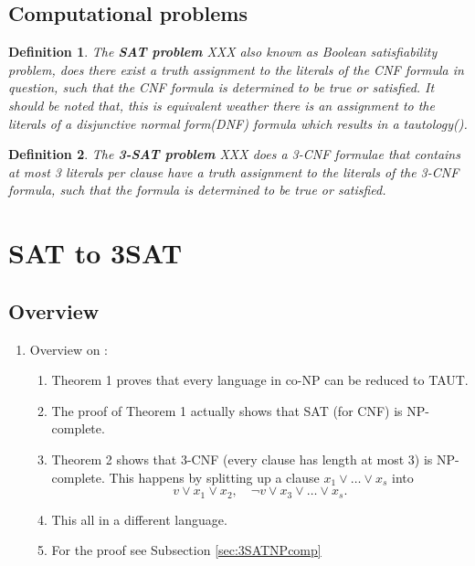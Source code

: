 \documentclass[a4paper]{report}
\newtheorem{defi}{Definition}[section]
\begin{document}
\section{Computational problems}
\label{sec:computationalproblems}

\begin{defi}\label{def:SATproblem}
  The \textbf{SAT problem} XXX also known as Boolean satisfiability problem, does there exist a truth assignment to the literals of the CNF formula in question, such that the CNF formula is determined to be true or satisfied. It should be noted that, this is equivalent weather there is an assignment to the literals of a disjunctive normal form(DNF) formula which results in a tautology(\cite{Karp1972NP}).
\end{defi}

\begin{defi}\label{def:3SATproblem}
  The \textbf{3-SAT problem} XXX does a 3-CNF formulae that contains at most 3 literals per clause have a truth assignment to the literals of the 3-CNF formula, such that the formula is
determined to be true or satisfied. 
\end{defi}




\chapter{SAT to 3SAT}
\label{cha:sat13}


\section{Overview}
\label{sec:sat13Overview}

\begin{enumerate}
\item Overview on \cite{Cook1971NP}:
  \begin{enumerate}
  \item Theorem 1 proves that every language in co-NP can be reduced to TAUT.
  \item The proof of Theorem 1 actually shows that SAT (for CNF) is NP-complete.
  \item Theorem 2 shows that 3-CNF (every clause has length at most 3) is NP-complete. This happens by splitting up a clause $x_1 \vee \dots \vee x_s$ into
    \begin{displaymath}
      v \vee x_1 \vee x_2, \quad \neg v \vee x_3 \vee \dots \vee x_s.
    \end{displaymath}
  \item This all in a different language.
  \item For the proof see Subsection \ref{sec:3SATNPcomp}
  \end{enumerate}
\end{enumerate}
\end{document}

